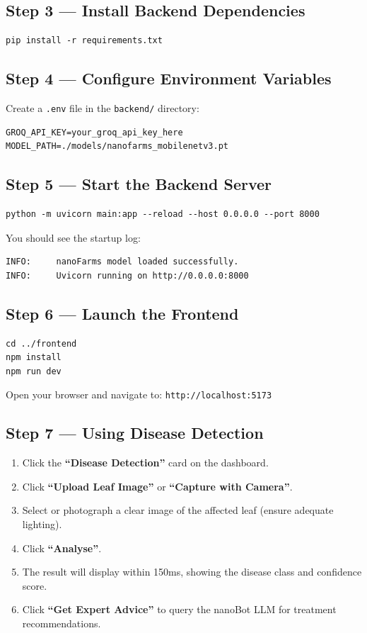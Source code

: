 \documentclass[12pt,oneside]{report}
\begin{document}
\subsection{Step 3 — Install Backend Dependencies}
\begin{verbatim}
pip install -r requirements.txt
\end{verbatim}

\subsection{Step 4 — Configure Environment Variables}
Create a \texttt{.env} file in the \texttt{backend/} directory:
\begin{verbatim}
GROQ_API_KEY=your_groq_api_key_here
MODEL_PATH=./models/nanofarms_mobilenetv3.pt
\end{verbatim}

\subsection{Step 5 — Start the Backend Server}
\begin{verbatim}
python -m uvicorn main:app --reload --host 0.0.0.0 --port 8000
\end{verbatim}

You should see the startup log:
\begin{verbatim}
INFO:     nanoFarms model loaded successfully.
INFO:     Uvicorn running on http://0.0.0.0:8000
\end{verbatim}

\subsection{Step 6 — Launch the Frontend}
\begin{verbatim}
cd ../frontend
npm install
npm run dev
\end{verbatim}

Open your browser and navigate to: \texttt{http://localhost:5173}

\subsection{Step 7 — Using Disease Detection}
\begin{enumerate}
    \item Click the \textbf{``Disease Detection''} card on the dashboard.
    \item Click \textbf{``Upload Leaf Image''} or \textbf{``Capture with Camera''}.
    \item Select or photograph a clear image of the affected leaf (ensure adequate lighting).
    \item Click \textbf{``Analyse''}.
    \item The result will display within 150ms, showing the disease class and confidence score.
    \item Click \textbf{``Get Expert Advice''} to query the nanoBot LLM for treatment recommendations.
\end{enumerate}
\end{document}

